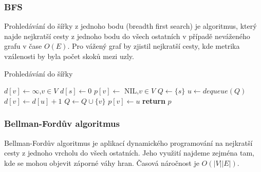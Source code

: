 \documentclass{bakalarka}
\begin{document}
\subsubsection{BFS}
Prohledávání do šířky z jednoho bodu (breadth first search) je algoritmus,
který najde nejkratší cesty z jednoho bodu do všech ostatních v případě
neváženého grafu v čase $O(E)$. Pro vážený graf by zjistil nejkratší cesty, kde
metrika vzálenosti by byla počet skoků mezi uzly.

\begin{center}
\begin{minipage}{\textwidth}
\begin{algorithm}[H]
	\caption{Prohledávání do šířky}
		\label{alg:bfs}
	\begin{algorithmic}[1]
	\Statex
		\State $d[v] \gets \infty$,$v \in V$
		\State $d[s] \gets 0$
		\State $p[v] \gets $ NIL,$v \in V$
		\State $Q \gets \{s\}$
			\State $u \gets dequeue(Q)$
					\State $d[v] \gets d[u] + 1$
					\State $Q \gets Q \cup \{v\}$
					\State $p[v] \gets u$
				\EndIf
			\EndFor
		\EndWhile
		\State \textbf{return} $p$
	\EndFunction
	\end{algorithmic}
\end{algorithm}
\end{minipage}
\end{center}
\mbox{}

\subsubsection{Bellman-Fordův algoritmus}
Bellman-Fordův algoritmus je aplikací dynamického programování na nejkratší
cesty z jednoho vrcholu do všech ostatních. Jeho využití najdeme zejména tam,
kde se mohou objevit záporné váhy hran. Časová náročnost je $O(|V||E|)$.
\end{document}
